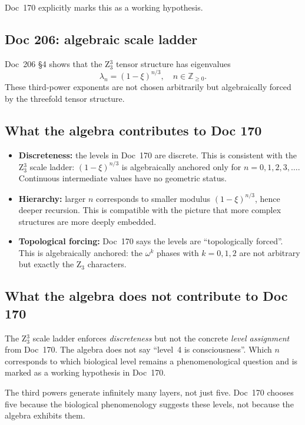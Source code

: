Doc~170 explicitly marks this as a working hypothesis.

\subsection{Doc 206: algebraic scale ladder}

Doc~206 \S4 shows that the Z$_3^3$ tensor structure has eigenvalues
\[
\lambda_n = (1-\xi)^{n/3}, \quad n \in \mathbb{Z}_{\geq 0}.
\]
These third-power exponents are not chosen arbitrarily but algebraically forced by the threefold tensor structure.

\subsection{What the algebra contributes to Doc 170}

\begin{itemize}
\item \textbf{Discreteness:} the levels in Doc~170 are discrete. This is consistent with the Z$_3^3$ scale ladder: $(1-\xi)^{n/3}$ is algebraically anchored only for $n = 0, 1, 2, 3, \dots$. Continuous intermediate values have no geometric status.
\item \textbf{Hierarchy:} larger $n$ corresponds to smaller modulus $(1-\xi)^{n/3}$, hence deeper recursion. This is compatible with the picture that more complex structures are more deeply embedded.
\item \textbf{Topological forcing:} Doc~170 says the levels are ``topologically forced''. This is algebraically anchored: the $\omega^k$ phases with $k = 0, 1, 2$ are not arbitrary but exactly the Z$_3$ characters.
\end{itemize}

\subsection{What the algebra does not contribute to Doc 170}

\begin{important}
The Z$_3^3$ scale ladder enforces \emph{discreteness} but not the concrete \emph{level assignment} from Doc~170. The algebra does not say ``level~4 is consciousness''. Which $n$ corresponds to which biological level remains a phenomenological question and is marked as a working hypothesis in Doc~170.
\end{important}

The third powers generate infinitely many layers, not just five. Doc~170 chooses five because the biological phenomenology suggests these levels, not because the algebra exhibits them.

